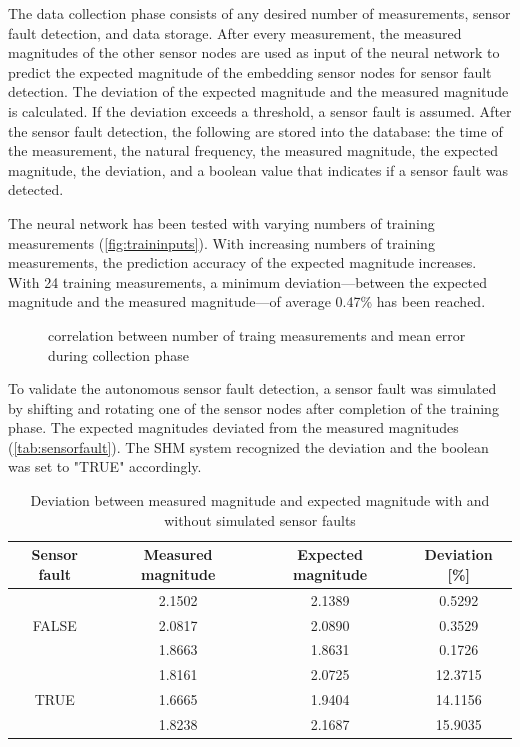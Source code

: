 \documentclass[12pt,a4paper]{scrartcl}
\begin{document}
The data collection phase consists of any desired number of measurements, sensor fault detection, and data storage.
After every measurement, the measured magnitudes of the other sensor nodes are used as input of the neural network to predict the expected magnitude of the embedding sensor nodes for sensor fault detection.
The deviation of the expected magnitude and the measured magnitude is calculated.
If the deviation exceeds a threshold, a sensor fault is assumed.
After the sensor fault detection, the following are stored into the database: the time of the measurement, the natural frequency, the measured magnitude, the expected magnitude, the deviation,  and a boolean value that indicates if a sensor fault was detected.

The neural network has been tested with varying numbers of training measurements (\autoref{fig:traininputs}).
With increasing numbers of training measurements, the prediction accuracy of the expected magnitude increases.
With 24 training measurements, a minimum deviation---between the expected magnitude and the measured magnitude---of average 0.47\% has been reached.

\begin{figure}[htb]
    \centering
    \caption{correlation between number of traing measurements and mean error during collection phase}
    \label{fig:traininputs}
\end{figure}

To validate the autonomous sensor fault detection, a sensor fault was simulated by shifting and rotating one of the sensor nodes after completion of the training phase.
The expected magnitudes deviated from the measured magnitudes (\autoref{tab:sensorfault}).
The SHM system recognized the deviation and the boolean was set to "TRUE" accordingly.

\begin{table}[hb]
	\centering
	\caption{Deviation between measured magnitude and expected magnitude with and without simulated sensor faults}
	\begin{tabular}{c c c c}
		\toprule
		Sensor fault & Measured magnitude & Expected magnitude & Deviation [\%]\\ 
		\midrule
		  & 2.1502 & 2.1389 & 0.5292 \\
		FALSE & 2.0817 & 2.0890 & 0.3529 \\
		  & 1.8663 & 1.8631 & 0.1726 \\
		\midrule	
		 & 1.8161 & 2.0725 & 12.3715\\
		TRUE & 1.6665 & 1.9404 & 14.1156\\
		 & 1.8238 & 2.1687 & 15.9035\\
		\bottomrule
	\end{tabular}
	\label{tab:sensorfault}
\end{table}
\end{document}
